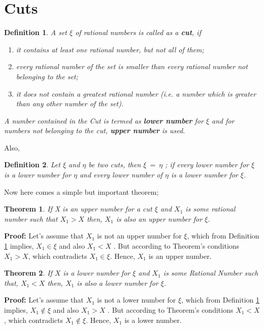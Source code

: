 \documentclass[12pt,a4paper,final,titlepage]{article}
\newtheorem{dfn}{Definition}
\newtheorem{thm}{Theorem}
\begin{document}
\section{Cuts}
\begin{dfn}\label{def1}
A set $\xi$ of rational numbers is called as a \textbf{cut}, if
\begin{enumerate}
\item it contains at least one rational number, but not all of them;
\item every rational number of the set is smaller than every rational number not belonging to the set;
\item it does not contain a greatest rational number (i.e. a number which is greater than any other number of the set).
\end{enumerate}
A number contained in the Cut is termed as \textbf{lower number} for $\xi$ and for numbers not belonging to the cut, \textbf{upper number} is used.
\end{dfn}
Also,
\begin{dfn}\label{def2}
Let $\xi$ and $\eta$ be two cuts, then $\xi\:=\:\eta$ ;
if every lower number for $\xi$ is a lower number for $\eta$ and every lower number of $\eta$ is a lower number for $\xi$.
\end{dfn}

Now here comes a simple but important theorem;

\begin{thm}\label{thm1}
If X is an upper number for a cut $\xi$ and $X_1$ is some rational number such that $X_1 > X$ then, $X_1$ is also an upper number for $\xi$.
\end{thm}
\textbf{Proof:} Let's assume that $X_1$ is not an upper number for $\xi$, which from Definition \ref{def1} implies, $X_1 \in \xi$ and also $X_1 < X$ . But according to Theorem's conditions $X_1 > X$, which contradicts $X_1 \in \xi$. Hence, $X_1$ is an upper number.

\medskip

\begin{thm}\label{thm2}
If $X$  is a lower number for $\xi$ and $X_1$ is some Rational Number such that, $X_1 < X$ then,
$X_1$ is also a lower number for $\xi$.
\end{thm}
\textbf{Proof:} Let's assume that $X_1$ is not a lower number for $\xi$, which from Definition \ref{def1} implies, $X_1 \notin \xi$ and also $X_1 > X$ . But according to Theorem's conditions $X_1 < X$, which contradicts $X_1 \notin \xi$. Hence, $X_1$ is a lower number.
\end{document}
